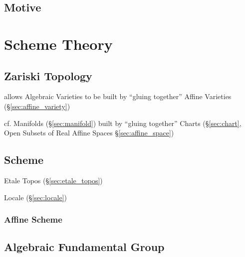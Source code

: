 \subsection{Motive}\label{sec:motive}



\section{Scheme Theory}\label{sec:scheme_theory}

\subsection{Zariski Topology}\label{sec:zariski_topology}

allows Algebraic Varieties to be built by ``gluing together'' Affine Varieties
 (\S\ref{sec:affine_variety})

cf. Manifolds (\S\ref{sec:manifold}) built by ``gluing together'' Charts
(\S\ref{sec:chart}, Open Subsets of Real Affine Spaces
\S\ref{sec:affine_space})



\subsection{Scheme}\label{sec:scheme}

Etale Topos (\S\ref{sec:etale_topos})

Locale (\S\ref{sec:locale})



\subsubsection{Affine Scheme}\label{sec:affine_scheme}



\subsection{Algebraic Fundamental Group}\label{sec:algebraic_fundamental_group}

